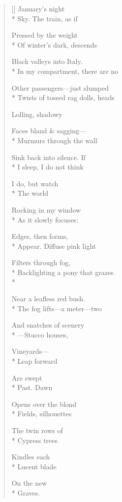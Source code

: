 \begin{verse}[\versewidth]
January's night\\*
Sky. The train, as if

Pressed by the weight\\*
Of winter's dark, descends

Black valleys into Italy.\\*
In my compartment, there are no

Other passengers---just slumped\\*
Twists of tossed rag dolls, heads

Lolling, shadowy

Faces bland \& sagging---\\*
Murmurs through the wall

Sink back into silence. \qquad If\\*
I sleep, I do not think

I do, but watch\\*
The world

Rocking in my window\\*
As it slowly focuses:

Edges, then forms,\\*
Appear. Diffuse pink light

Filters through fog,\\*
Backlighting a pony that grazes\\*

Near a leafless red bush.\\*
The fog lifts---a meter---two

And snatches of scenery\\*
---Stucco houses,

Vineyards---\\*
Leap forward

Are swept\\*
Past. \qquad Dawn

Opens over the blond\\*
Fields, silhouettes

The twin rows of\\*
Cypress trees

Kindles each\\*
Lucent blade

On the new\\*
Graves.
\end{verse}
